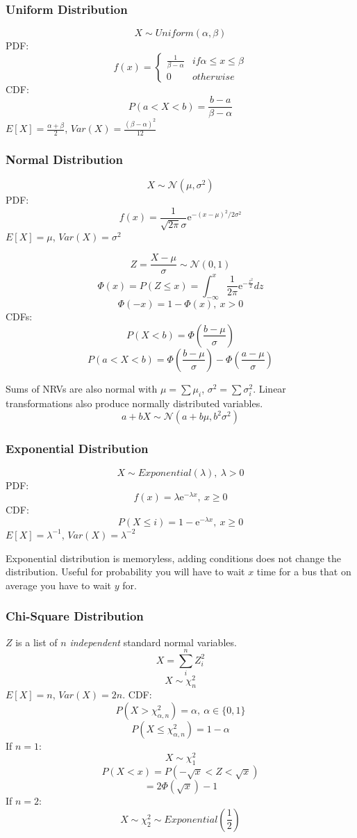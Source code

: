 \subsubsection{Uniform Distribution}
$$X\sim Uniform(\alpha, \beta)$$
PDF:
\begin{equation*}
  f(x) =
\begin{cases*}
  \frac{1}{\beta-\alpha} & if \alpha \leq x \leq \beta\\
  0 & otherwise
\end{cases*}
\end{equation*}
CDF:
$$P(a < X < b) = \frac{b-a}{\beta-\alpha}$$
$E[X] = \frac{\alpha + \beta}{2}$, $Var(X) = \frac{(\beta-\alpha)^2}{12}$

\subsubsection{Normal Distribution}
$$X\sim \mathcal{N}(\mu, \sigma^2)$$
PDF:
$$f(x) = \frac{1}{\sqrt{2\pi}\sigma}\mathrm{e}^{-(x-\mu)^2/2\sigma^2}$$
$E[X] = \mu$, $Var(X) = \sigma^2$

$$Z=\frac{X-\mu}{\sigma} \sim \mathcal{N}(0, 1)$$
$$\Phi(x) = P(Z\leq x) = \int_{-\infty}^x \frac{1}{2\pi} \mathrm{e}^{-\frac{z^2}{2}} dz$$
$$\Phi(-x) = 1-\Phi(x),\ x > 0$$
CDFs:
$$P(X < b) = \Phi\left(\frac{b-\mu}{\sigma}\right)$$
$$P(a < X < b) = \Phi\left(\frac{b-\mu}{\sigma}\right) - \Phi\left(\frac{a-\mu}{\sigma}\right)$$

Sums of NRVs are also normal with $\mu = \sum \mu_i$, $\sigma^2 = \sum \sigma^2_i$.
Linear transformations also produce normally distributed variables.
$$a+bX \sim \mathcal{N}(a+b\mu, b^2\sigma^2)$$

\subsubsection{Exponential Distribution}
$$X\sim Exponential(\lambda),\ \lambda > 0$$
PDF:
$$f(x) = \lambda \mathrm{e}^{-\lambda x},\ x \geq 0$$
CDF:
$$P(X \leq i) = 1-\mathrm{e}^{-\lambda x},\ x \geq 0$$
$E[X] = \lambda^{-1}$, $Var(X) = \lambda^{-2}$

Exponential distribution is memoryless, adding conditions does not change the distribution.
Useful for probability you will have to wait $x$ time for a bus that on average you have to wait $y$ for.

\subsubsection{Chi-Square Distribution}
$Z$ is a list of $n$ \textit{independent} standard normal variables.
$$X=\sum_i^n Z_i^2$$
$$X\sim \chi_n^2$$
$E[X] = n$, $Var(X) = 2n$.
CDF:
$$P(X > \chi_{\alpha,n}^2) = \alpha,\ \alpha\in \{0,1\}$$
$$P(X \leq \chi_{\alpha,n}^2) = 1-\alpha$$
If $n=1$:
$$X\sim \chi_1^2$$
$$P(X<x) = P(-\sqrt{x} < Z < \sqrt{x})$$
$$=2\Phi(\sqrt{x})-1$$
If $n=2$:
$$X\sim \chi_2^2 \sim Exponential\left(\frac{1}{2}\right)$$
